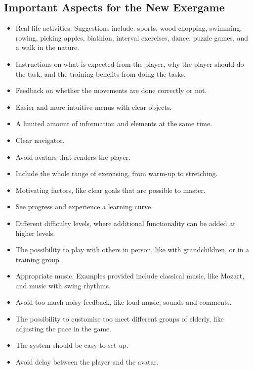 \subsection{Important Aspects for the New Exergame}
\begin{itemize}
\item Real life activities. Suggestions include: sports, wood chopping, swimming, rowing, picking apples, biathlon, interval exercises, dance, puzzle games, and a walk in the nature.
\item Instructions on what is expected from the player, why the player should do the task, and the training benefits from doing the tasks.
\item Feedback on whether the movements are done correctly or not.
\item Easier and more intuitive menus with clear objects.
\item A limited amount of information and elements at the same time.
\item Clear navigator.
\item Avoid avatars that renders the player.
\item Include the whole range of exercising, from warm-up to stretching.
\item Motivating factors, like clear goals that are possible to master.
\item See progress and experience a learning curve.
\item Different difficulty levels, where additional functionality can be added at higher levels.
\item The possibility to play with others in person, like with grandchildren, or in a training group.
\item Appropriate music. Examples provided include classical music, like Mozart, and music with swing rhythms.
\item Avoid too much noisy feedback, like loud music, sounds and comments.
\item The possibility to customise too meet different groups of elderly, like adjusting the pace in the game.
\item The system should be easy to set up.
\item Avoid delay between the player and the avatar.
\end{itemize}






